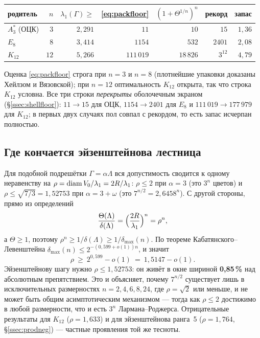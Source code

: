 \begin{center}
\begin{tabular}{@{}lrrrrrr@{}}
\toprule
родитель & $n$ & $\lambda_1(\Gamma)\ge$ & \eqref{eq:packfloor} &
$(1+\Theta^{1/n})^n$ & рекорд & запас\\
\midrule
$A_3^*$ (ОЦК) & $3$  & $2{,}291$ & $11$      & $10$      & $15$      & $1{,}36$\\
$E_8$         & $8$  & $3{,}414$ & $1154$    & $532$     & $2401$    & $2{,}08$\\
$K_{12}$      & $12$ & $5{,}266$ & $111\,019$& $18\,826$ & $3^{12}$  & $4{,}79$\\
\bottomrule
\end{tabular}
\end{center}

Оценка \eqref{eq:packfloor} строга при $n=3$ и $n=8$ (плотнейшие упаковки
доказаны Хейлзом и Вязовской); при $n=12$ оптимальность $K_{12}$ открыта, так
что строка $K_{12}$ условна. Все три строки \emph{перекрыты} оболочечным
экраном (\S\ref{ssec:shellfloor}): $11\to15$ для ОЦК, $1154\to2401$ для $E_8$
и $111\,019\to177\,979$ для $K_{12}$; в первых двух случаях пол совпал с
рекордом, то есть запас исчерпан полностью.

\subsection{Где кончается эйзенштейнова лестница}
\label{ssec:kl}

Для подобной подрешётки $\Gamma=\alpha\Lambda$ вся допустимость сводится к
одному неравенству на $\rho=\operatorname{diam} V_0/\lambda_1=2R/\lambda_1$: $\rho\le2$ при
$\alpha=3$ (это $3^n$ цветов) и $\rho\le\sqrt{7/3}=1{,}52753$ при
$\alpha=3+\omega$ (это $7^{n/2}=2{,}6458^n$). С другой стороны, прямо из
определений
\begin{equation}\label{eq:rhoid}
\frac{\Theta(\Lambda)}{\delta(\Lambda)}
=\Bigl(\frac{2R}{\lambda_1}\Bigr)^{n}=\rho^{n},
\end{equation}
а $\Theta\ge1$, поэтому $\rho^n\ge1/\delta(\Lambda)\ge1/\delta_{\max}(n)$. По
теореме Кабатянского--Левенштейна $\delta_{\max}(n)\le2^{-(0{,}599+o(1))n}$, и
значит
\[
\rho\ \ge\ 2^{0{,}599}-o(1)\ =\ 1{,}5147-o(1).
\]
Эйзенштейнову шагу нужно $\rho\le1{,}52753$: он живёт в окне шириной
\textbf{0{,}85\,\%} над абсолютным препятствием. Это и объясняет, почему
$7^{n/2}$ существует лишь в исключительных размерностях $n=2,4,6,8,24$, где
$\rho=\sqrt2$ или меньше, и не может быть общим асимптотическим механизмом ---
тогда как $\rho\le2$ достижимо в любой размерности, что и есть $3^n$
Лармана--Роджерса. Отрицательные результаты для $K_{12}$
($\rho=1{,}633$) и для эйзенштейнова ранга~5 ($\rho=1{,}764$,
\S\ref{ssec:prodneg}) --- частные проявления той же тесноты.
